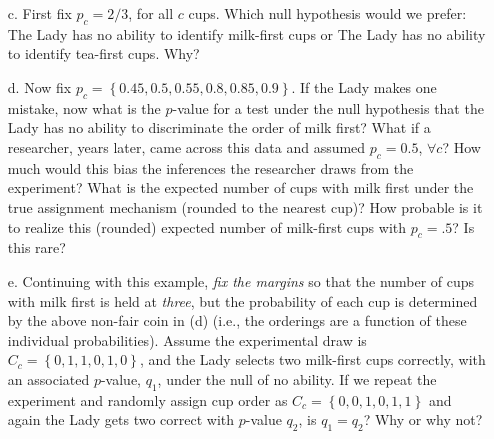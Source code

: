 \documentclass{article}
\begin{document}
\begin{itemize}

\item[c.] First fix $p_c=2/3$, for all $c$ cups.  Which null hypothesis would we prefer: The Lady has no
  ability to identify milk-first cups or The Lady has no ability to
  identify tea-first cups. Why?



\item[d.] Now fix $p_c=\left\{ 0.45,0.5,0.55,0.8,0.85,0.9 \right\} $.
  If the Lady makes one mistake, now what is the $p$-value for a test
  under the null hypothesis that the Lady has no ability to
  discriminate the order of milk first?  What if a researcher, years
  later, came across this data and assumed $p_c=0.5$, $\forall c$?
  How much would this bias the inferences the researcher draws from
  the experiment?  What is the expected number of cups with milk first
  under the true assignment mechanism (rounded to the nearest cup)?
  How probable is it to realize this (rounded) expected number of
  milk-first cups with $p_c = .5$?  Is this rare?



\item[e.] Continuing with this example, {\em fix the margins} so that
  the number of cups with milk first is held at {\em three}, but the
  probability of each cup is determined by the above non-fair coin in
  (d) (i.e., the orderings are a function of these individual
  probabilities).  Assume the experimental draw is $C_c = \left\{ 0,
    1, 1, 0, 1, 0 \right\}$, and the Lady selects two milk-first cups
  correctly, with an associated $p$-value, $q_1$, under the null of no
  ability.  If we repeat the experiment and randomly assign cup order
  as $C_c = \left\{ 0, 0, 1, 0, 1, 1\right\}$ and again the Lady gets
  two correct with $p$-value $q_2$, is $q_1=q_2$?  Why or why not?


\end{itemize}
\end{document}
